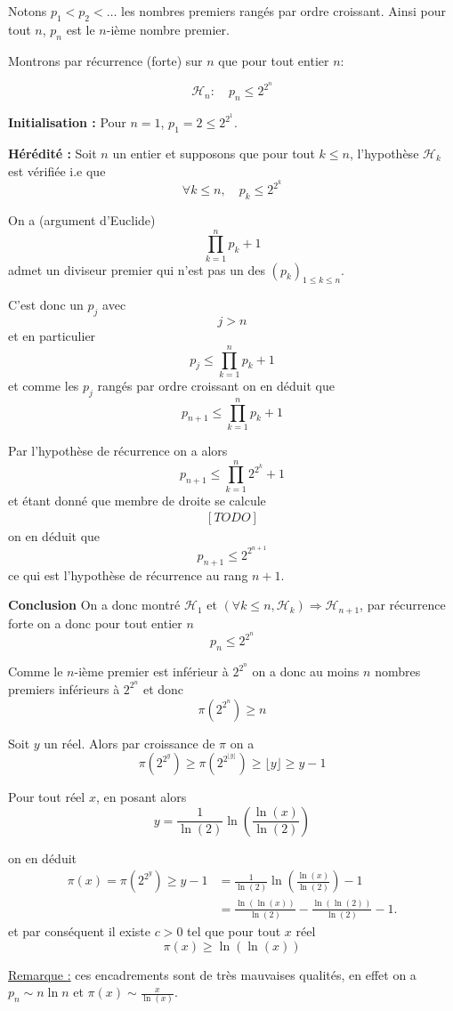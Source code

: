 \begin{sol}
  Notons $p_1 < p_2 < \ldots$ les nombres premiers rangés par ordre croissant. Ainsi pour tout $n$, $p_n$ est le $n$-ième nombre premier.
  
  Montrons par récurrence (forte) sur $n$ que pour tout entier $n$:

  $$\mathcal{H}_n: \quad p_n \le 2^{2^n}$$
  
  \textbf{Initialisation :} Pour $n=1$, $p_1 = 2 \le 2^{2^1}$.


  \textbf{Hérédité :} Soit $n$ un entier et supposons que pour tout $k \le n$, l'hypothèse $\mathcal{H}_k$ est vérifiée i.e que
  $$\forall k \le n, \quad p_k \le 2^{2^k}$$

  On a (argument d'Euclide)
  $$\prod_{k=1}^n p_k +1$$
  admet un diviseur premier qui n'est pas un des $(p_k)_{1 \le k \le n}$.

  C'est donc un $p_j$ avec $$j > n$$ et en particulier
  $$p_j \le \prod_{k=1}^n p_k +1$$
  et comme les $p_j$ rangés par ordre croissant on en déduit que
  $$p_{n+1} \le \prod_{k=1}^n p_k +1$$


  Par l'hypothèse de récurrence on a alors
  $$p_{n+1} \le \prod_{k=1}^n 2^{2^k} +1$$
  et étant donné que membre de droite se calcule
  $$\begin{aligned}
      [TODO]
  \end{aligned}$$
  on en déduit que
  $$p_{n+1} \le 2^{2^{n+1}}$$
  ce qui est l'hypothèse de récurrence au rang $n+1$.


  \textbf{Conclusion} On a donc montré $\mathcal{H}_1$ et $\left(\forall k \le n, \mathcal{H}_k \right) \Rightarrow \mathcal{H}_{n+1}$, par récurrence forte on a donc pour tout entier $n$
  $$\boxed{p_n \le 2^{2^n}}$$

  Comme le $n$-ième premier est inférieur à $2^{2^n}$ on a donc au moins $n$ nombres premiers inférieurs à $2^{2^n}$ et donc 
  $$\pi(2^{2^n}) \ge n$$

  Soit $y$ un réel. Alors par croissance de $\pi$ on a
  $$\pi(2^{2^{y}}) \ge \pi(2^{2^{\lfloor y \rfloor}})  \ge \lfloor y \rfloor \ge y-1$$

  Pour tout réel $x$, en posant alors
  $$ y = \frac{1}{\ln(2)}\ln \left( \frac{\ln(x)}{\ln(2)} \right) $$

  on en déduit
  \begin{equation*}
      \begin{aligned}
          \pi(x) =\pi \left( 2^{2^y} \right) \ge y -1 &= \frac{1}{\ln(2)}\ln \left( \frac{\ln(x)}{\ln(2)} \right) -1\\
          &=\frac{\ln(\ln(x))}{\ln(2)}- \frac{\ln(\ln(2))}{\ln(2)} -1.
      \end{aligned}
  \end{equation*}
  et par conséquent il existe $c > 0$ tel que pour tout $x$ réel
  $$\boxed{\pi(x) \ge \ln(\ln(x))}$$

  \underline{Remarque :} ces encadrements sont de très mauvaises qualités, en effet on a $p_n \sim n \ln n$ et $\pi(x) \sim \frac{x}{\ln(x)}$.
\end{sol}

